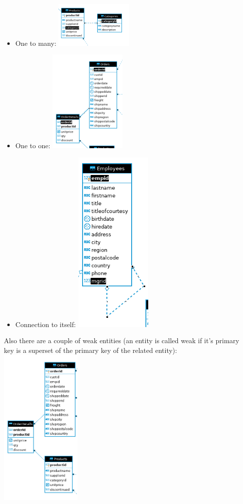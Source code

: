 \documentclass[a4paper]{article}
\begin{document}
\begin{itemize}
    \item One to many:
        \includegraphics[width=0.3\textwidth]{one_to_many}
    \item One to one:
        \includegraphics[width=0.3\textwidth]{one_to_one}
    \item Connection to itself:
        \includegraphics[width=0.3\textwidth]{connection_to_itself}
\end{itemize}
Also there are a couple of weak entities (an entity is called weak if it's primary
key is a superset of the primary key of the related entity):
\includegraphics[width=0.3\textwidth]{weak_connection}
\end{document}
